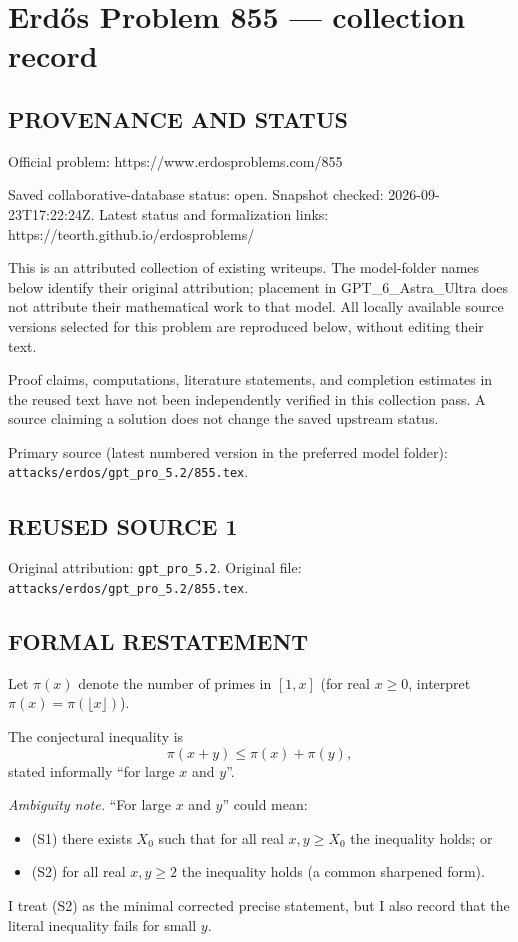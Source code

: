\section*{Erd\H{o}s Problem 855 --- collection record}

\subsection*{PROVENANCE AND STATUS}
Official problem: https://www.erdosproblems.com/855

Saved collaborative-database status: open.
Snapshot checked: 2026-09-23T17:22:24Z.
Latest status and formalization links: https://teorth.github.io/erdosproblems/

This is an attributed collection of existing writeups. The model-folder names below identify their original attribution; placement in GPT\_6\_Astra\_Ultra does not attribute their mathematical work to that model. All locally available source versions selected for this problem are reproduced below, without editing their text.

Proof claims, computations, literature statements, and completion estimates in the reused text have not been independently verified in this collection pass. A source claiming a solution does not change the saved upstream status.

Primary source (latest numbered version in the preferred model folder): \texttt{attacks/erdos/gpt\_pro\_5.2/855.tex}.

\subsection*{REUSED SOURCE 1}
Original attribution: \texttt{gpt\_pro\_5.2}.
Original file: \texttt{attacks/erdos/gpt\_pro\_5.2/855.tex}.


\subsection*{FORMAL RESTATEMENT}
Let $\pi(x)$ denote the number of primes in $[1,x]$ (for real $x\ge 0$, interpret $\pi(x)=\pi(\lfloor x\rfloor)$).

The conjectural inequality is
\[
  \pi(x+y) \le \pi(x)+\pi(y),
\]
stated informally ``for large $x$ and $y$''.

\emph{Ambiguity note.} ``For large $x$ and $y$'' could mean:
\begin{itemize}
\item (S1) there exists $X_0$ such that for all real $x,y\ge X_0$ the inequality holds; or
\item (S2) for all real $x,y\ge 2$ the inequality holds (a common sharpened form).
\end{itemize}
I treat (S2) as the minimal corrected precise statement, but I also record that the literal inequality fails for small $y$.

